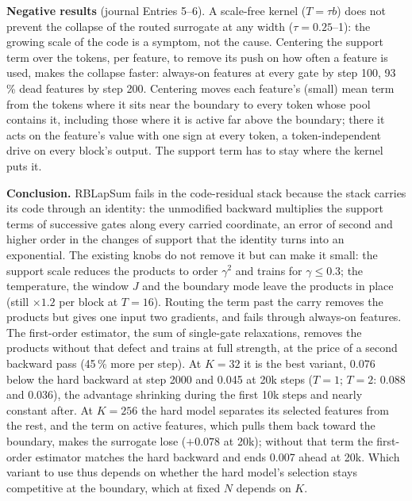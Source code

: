 \documentclass[10pt,a4paper]{article}
\begin{document}
\textbf{Negative results} (journal Entries 5--6).  A scale-free kernel (\(T=\tau b\)) does not prevent the collapse of
the routed surrogate at any width (\(\tau=0.25\)--1): the growing scale of the code is a symptom, not the cause.
Centering the support term over the tokens, per feature, to remove its push on how often a feature is used, makes
the collapse faster: always-on features at every gate by step 100, 93\,\% dead features by step 200.  Centering moves
each feature's (small) mean term from the tokens where it sits near the boundary to every token whose pool contains
it, including those where it is active far above the boundary; there it acts on the feature's value with one sign at
every token, a token-independent drive on every block's output.  The support term has to stay where the kernel
puts it.

\textbf{Conclusion.}  RBLapSum fails in the code-residual stack because the stack carries its code through an
identity: the unmodified backward multiplies the support terms of successive gates along every carried coordinate,
an error of second and higher order in the changes of support that the identity turns into an exponential.  The
existing knobs do not remove it but can make it small: the support scale reduces the products to order \(\gamma^2\)
and trains for \(\gamma\le0.3\); the temperature, the window \(J\) and the boundary mode leave the products in place
(still \(\times1.2\) per block at \(T=16\)).  Routing the term
past the carry removes the products but gives one input two gradients, and fails through always-on features.  The
first-order estimator, the sum of single-gate relaxations, removes the products without that defect and trains at
full strength, at the price of a second backward pass (45\,\% more per step).  At \(K=32\) it is the best variant,
0.076 below the hard backward at step 2000 and 0.045 at 20k steps (\(T=1\); \(T=2\): 0.088 and 0.036), the advantage
shrinking during the first 10k steps and nearly constant after.  At \(K=256\) the hard model separates its selected features from the rest, and the term on active features,
which pulls them back toward the boundary, makes the surrogate lose (\(+0.078\) at 20k); without that term the first-order
estimator matches the hard backward and ends 0.007 ahead at 20k.  Which variant to use thus depends on whether the
hard model's selection stays competitive at the boundary, which at fixed \(N\) depends on \(K\).
\end{document}
